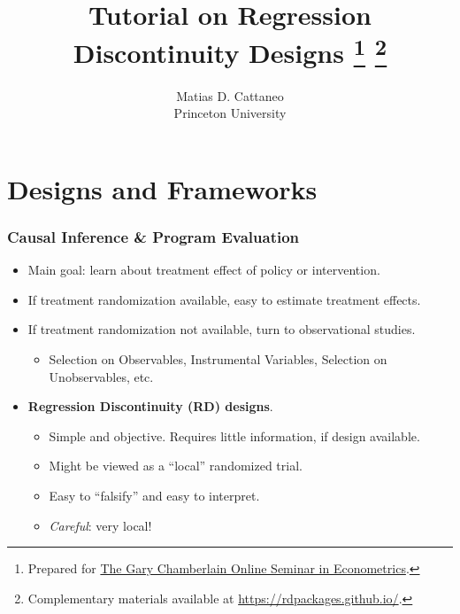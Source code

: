 \documentclass[9pt]{beamer}
\begin{document}
\title[]{Tutorial on Regression Discontinuity Designs
	     \thanks{Prepared for \href{https://www.chamberlainseminar.org/}{The Gary Chamberlain Online Seminar in Econometrics}.}
	     \thanks{Complementary materials available at \url{https://rdpackages.github.io/}.}\medskip}
\author{Matias D. Cattaneo\medskip \\
	    Princeton University\medskip }
\maketitle



\section{Designs and Frameworks}

\begin{frame}\frametitle{Causal Inference \& Program Evaluation}
	\begin{itemize}
		\item Main goal: learn about treatment effect of policy or intervention.\bigskip
		
		\item If treatment randomization available, easy to estimate treatment effects.\bigskip
		
		\item If treatment randomization not available, turn to observational studies.\medskip
		
		\begin{itemize}
			\item Selection on Observables, Instrumental Variables, Selection on Unobservables, etc.\bigskip
		\end{itemize}
		
		\item \textbf{Regression Discontinuity (RD) designs}.\medskip
		
		\begin{itemize}
			\item Simple and objective. Requires little information, if design available.\medskip
			
			\item Might be viewed as a ``local'' randomized trial.\medskip
			
			\item Easy to ``falsify'' and easy to interpret.\medskip
			
			\item \emph{Careful}: very local!
		\end{itemize}
	\end{itemize}
\end{frame}
\end{document}
